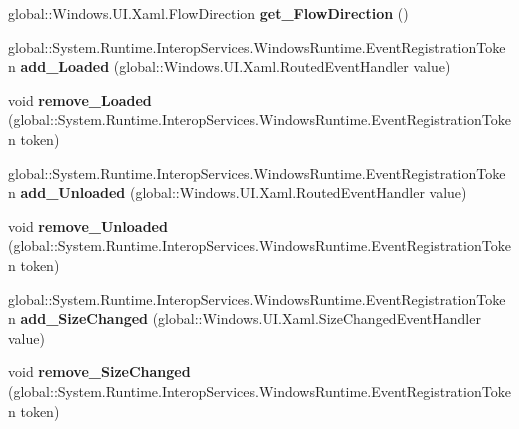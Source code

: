 \begin{DoxyCompactItemize}
global\+::\+Windows.\+U\+I.\+Xaml.\+Flow\+Direction {\bfseries get\+\_\+\+Flow\+Direction} ()
\item 
\mbox{\label{interface_windows_1_1_u_i_1_1_xaml_1_1_i_framework_element_a09af92bc5fcaa9a8925401ddcd75d36e}} 
global\+::\+System.\+Runtime.\+Interop\+Services.\+Windows\+Runtime.\+Event\+Registration\+Token {\bfseries add\+\_\+\+Loaded} (global\+::\+Windows.\+U\+I.\+Xaml.\+Routed\+Event\+Handler value)
\item 
\mbox{\label{interface_windows_1_1_u_i_1_1_xaml_1_1_i_framework_element_aafdb3efaeb2c040c7e5209bb37317e74}} 
void {\bfseries remove\+\_\+\+Loaded} (global\+::\+System.\+Runtime.\+Interop\+Services.\+Windows\+Runtime.\+Event\+Registration\+Token token)
\item 
\mbox{\label{interface_windows_1_1_u_i_1_1_xaml_1_1_i_framework_element_ad4ed2f244c6516761d641431768f021b}} 
global\+::\+System.\+Runtime.\+Interop\+Services.\+Windows\+Runtime.\+Event\+Registration\+Token {\bfseries add\+\_\+\+Unloaded} (global\+::\+Windows.\+U\+I.\+Xaml.\+Routed\+Event\+Handler value)
\item 
\mbox{\label{interface_windows_1_1_u_i_1_1_xaml_1_1_i_framework_element_a3289e30bb0249071801645260d266744}} 
void {\bfseries remove\+\_\+\+Unloaded} (global\+::\+System.\+Runtime.\+Interop\+Services.\+Windows\+Runtime.\+Event\+Registration\+Token token)
\item 
\mbox{\label{interface_windows_1_1_u_i_1_1_xaml_1_1_i_framework_element_abf3ac37a9daffc43b7299c8aa7b02e4a}} 
global\+::\+System.\+Runtime.\+Interop\+Services.\+Windows\+Runtime.\+Event\+Registration\+Token {\bfseries add\+\_\+\+Size\+Changed} (global\+::\+Windows.\+U\+I.\+Xaml.\+Size\+Changed\+Event\+Handler value)
\item 
\mbox{\label{interface_windows_1_1_u_i_1_1_xaml_1_1_i_framework_element_aee2c3dbe7e3702a98c8bff9f0c4720c0}} 
void {\bfseries remove\+\_\+\+Size\+Changed} (global\+::\+System.\+Runtime.\+Interop\+Services.\+Windows\+Runtime.\+Event\+Registration\+Token token)

\end{DoxyCompactItemize}
